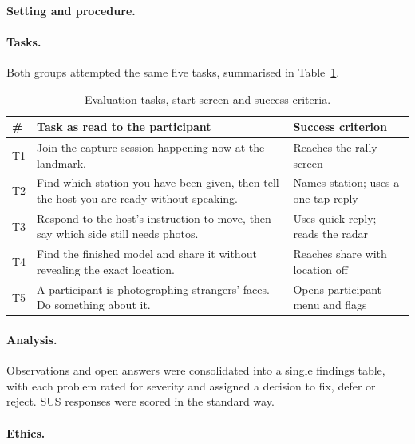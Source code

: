 \paragraph{Setting and procedure.} 

\paragraph{Tasks.} Both groups attempted the same five tasks, summarised in
Table~\ref{tab:tasks}.

\begin{table}[htbp]
\centering
\caption{Evaluation tasks, start screen and success criteria.}
\label{tab:tasks}
\small
\begin{tabularx}{\textwidth}{@{}lXl@{}}
\toprule
\textbf{\#} & \textbf{Task as read to the participant} & \textbf{Success criterion} \\
\midrule
T1 & Join the capture session happening now at the landmark. & Reaches the rally screen \\
T2 & Find which station you have been given, then tell the host you are ready without speaking. & Names station; uses a one-tap reply \\
T3 & Respond to the host's instruction to move, then say which side still needs photos. & Uses quick reply; reads the radar \\
T4 & Find the finished model and share it without revealing the exact location. & Reaches share with location off \\
T5 & A participant is photographing strangers' faces. Do something about it. & Opens participant menu and flags \\
\bottomrule
\end{tabularx}
\end{table}

\paragraph{Analysis.} Observations and open answers were consolidated into a single findings table,
with each problem rated for severity and assigned a decision to fix, defer or reject. SUS responses
were scored in the standard way.

\paragraph{Ethics.} 
